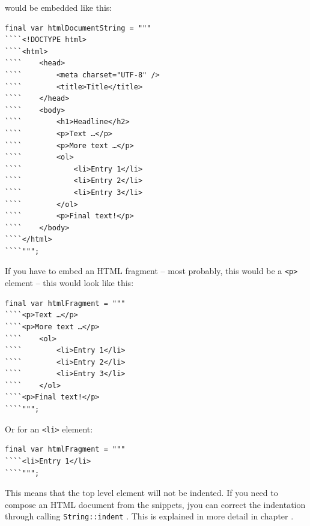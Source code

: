 would be embedded like this:
\begin{lstlisting}
final var htmlDocumentString = """
````<!DOCTYPE html>
````<html>
````    <head>
````        <meta charset="UTF-8" />
````        <title>Title</title>
````    </head>
````    <body>
````        <h1>Headline</h2>
````        <p>Text …</p>
````        <p>More text …</p>
````        <ol>
````            <li>Entry 1</li>
````            <li>Entry 2</li>
````            <li>Entry 3</li>
````        </ol>
````        <p>Final text!</p>
````    </body>
````</html>
````""";
\end{lstlisting}

If you have to embed an HTML fragment – most probably, this would be a \verb#<p># element – this would look like this:
\begin{lstlisting}
final var htmlFragment = """
````<p>Text …</p>
````<p>More text …</p>
````    <ol>
````        <li>Entry 1</li>
````        <li>Entry 2</li>
````        <li>Entry 3</li>
````    </ol>
````<p>Final text!</p>
````""";
\end{lstlisting}

Or for an \verb#<li># element:
\begin{lstlisting}
final var htmlFragment = """
````<li>Entry 1</li>
````""";
\end{lstlisting}

This means that the top level element will not be indented. If you need to compose an HTML document from the snippets, jyou can correct the indentation through calling \lstinline|String::indent| \autocite{ORACLE_DOC_STRING:indent}. This is explained in more detail in chapter .


